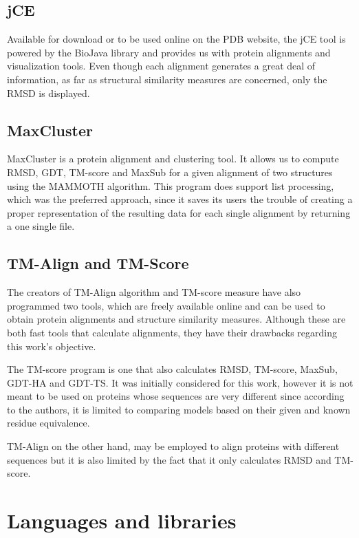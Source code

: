 \subsection{jCE}

\cite{prlic2010pre}

Available for download or to be used online on the PDB website, the jCE tool is powered by the BioJava library and provides us with protein alignments and visualization tools. Even though each alignment generates a great deal of information, as far as structural similarity measures are concerned, only the RMSD is displayed.

\subsection{MaxCluster}

MaxCluster is a protein alignment and clustering tool. It allows us to compute RMSD, GDT, TM-score and MaxSub for a given alignment of two structures using the MAMMOTH algorithm. This program does support list processing, which was the preferred approach, since it saves its users the trouble of creating a proper representation of the resulting data for each single alignment by returning a one single file. \cite{herbert2008maxcluster}

\subsection{TM-Align and TM-Score}

The creators of TM-Align algorithm and TM-score measure have also programmed two tools, which are freely available online and can be used to obtain protein alignments and structure similarity measures. Although these are both fast tools that calculate alignments, they have their drawbacks regarding this work's objective. 

The TM-score program is one that also calculates RMSD, TM-score, MaxSub, GDT-HA and GDT-TS. It was initially considered for this work, however it is not meant to be used on proteins whose sequences are very different since according to the authors, it is limited to comparing models based on their given and known residue equivalence.

TM-Align on the other hand, may be employed to align proteins with different sequences but it is also limited by the fact that it only calculates RMSD and TM-score.

\section{Languages and libraries}

